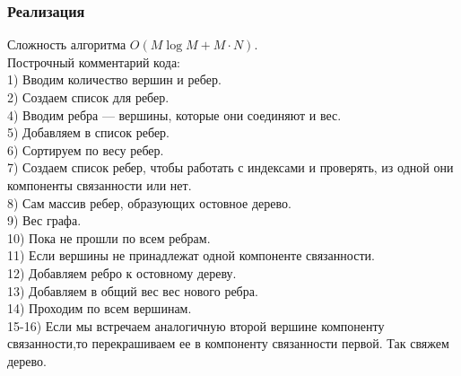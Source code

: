 \subsubsection{Реализация}
Сложность алгоритма $O(M \log M + M\cdot N)$.\\
Построчный комментарий кода:\\
1) Вводим количество вершин и ребер.\\
2) Создаем список для ребер.\\
4) Вводим ребра --- вершины, которые они соединяют и вес.\\
5) Добавляем в список ребер.\\
6) Сортируем по весу ребер.\\
7) Создаем список ребер, чтобы работать с индексами и проверять, из одной они компоненты связанности или нет.\\
8) Сам массив ребер, образующих остовное дерево.\\
9) Вес графа.\\
10) Пока не прошли по всем ребрам.\\
11) Если вершины не принадлежат одной компоненте связанности.\\
12) Добавляем ребро к остовному дереву.\\
13) Добавляем в общий вес вес нового ребра.\\
14) Проходим по всем вершинам.\\
15-16) Если мы встречаем аналогичную второй вершине компоненту связанности,то перекрашиваем ее в компоненту связанности первой. Так свяжем дерево.\\






















